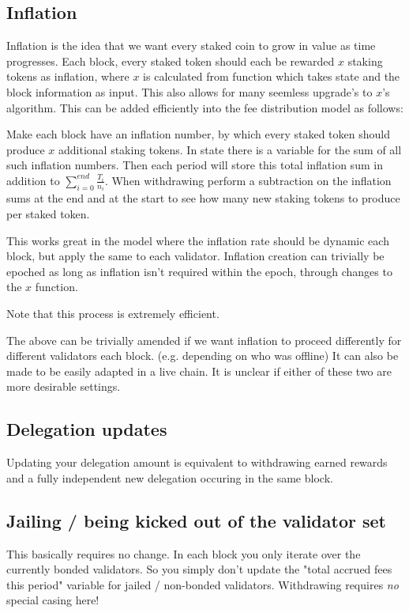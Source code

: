 \documentclass[]{article}
\begin{document}
\subsection{Inflation}
Inflation is the idea that we want every staked coin to grow in value as time progresses. Each block, every staked token should each be rewarded $x$ staking tokens as inflation, where $x$ is calculated from function which takes state and the block information as input. This also allows for many seemless upgrade's to $x$'s algorithm. This can be added efficiently into the fee distribution model as follows:

Make each block have an inflation number, by which every staked token should produce $x$ additional staking tokens. In state there is a variable for the sum of all such inflation numbers. Then each period will store this total inflation sum in addition to $\sum_{i=0}^{end}\frac{T_i}{n_i}$. When withdrawing perform a subtraction on the inflation sums at the end and at the start to see how many new staking tokens to produce per staked token. 

This works great in the model where the inflation rate should be dynamic each block, but apply the same to each validator. Inflation creation can trivially be epoched as long as inflation isn't required within the epoch, through changes to the $x$ function.

Note that this process is extremely efficient.

The above can be trivially amended if we want inflation to proceed differently for different validators each block. (e.g. depending on who was offline) It can also be made to be easily adapted in a live chain. It is unclear if either of these two are more desirable settings.

\subsection{Delegation updates}
Updating your delegation amount is equivalent to withdrawing earned rewards and a fully independent new delegation occuring in the same block.

\subsection{Jailing / being kicked out of the validator set}
This basically requires no change. In each block you only iterate over the currently bonded validators. So you simply don't update the "total accrued fees this period" variable for jailed / non-bonded validators. Withdrawing requires \textit{no} special casing here!
\end{document}
